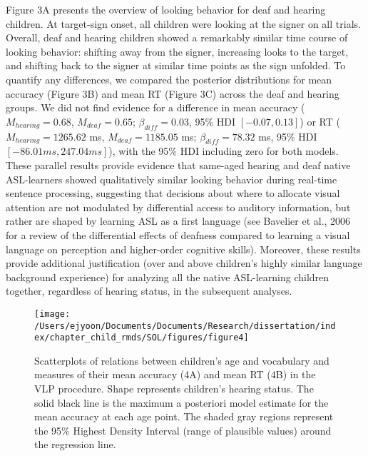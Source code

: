 \documentclass[oneside]{report}
\begin{document}
Figure 3A presents the overview of looking behavior for deaf and hearing
children. At target-sign onset, all children were looking at the signer
on all trials. Overall, deaf and hearing children showed a remarkably
similar time course of looking behavior: shifting away from the signer,
increasing looks to the target, and shifting back to the signer at
similar time points as the sign unfolded. To quantify any differences,
we compared the posterior distributions for mean accuracy (Figure 3B)
and mean RT (Figure 3C) across the deaf and hearing groups. We did not
find evidence for a difference in mean accuracy (\(M_{hearing} = 0.68\),
\(M_{deaf} = 0.65\); \(\beta_{diff} = 0.03\), 95\% HDI
\([-0.07, 0.13]\)) or RT (\(M_{hearing} = 1265.62\) ms,
\(M_{deaf} = 1185.05\) ms; \(\beta_{diff} = 78.32\) ms, 95\% HDI
\([-86.01 ms, 247.04 ms]\)), with the 95\% HDI including zero for both
models. These parallel results provide evidence that same-aged hearing
and deaf native ASL-learners showed qualitatively similar looking
behavior during real-time sentence processing, suggesting that decisions
about where to allocate visual attention are not modulated by
differential access to auditory information, but rather are shaped by
learning ASL as a first language (see Bavelier et al., 2006 for a review
of the differential effects of deafness compared to learning a visual
language on perception and higher-order cognitive skills). Moreover,
these results provide additional justification (over and above
children's highly similar language background experience) for analyzing
all the native ASL-learning children together, regardless of hearing
status, in the subsequent analyses.
\begin{figure}[!t]

{\centering \texttt{[image: /Users/ejyoon/Documents/Documents/Research/dissertation/index/chapter\_child\_rmds/SOL/figures/figure4]} 

}

\caption[Scatterplots of relations between children's age and vocabulary and ASL processing]{Scatterplots of relations between children's age and vocabulary and measures of their mean accuracy (4A) and mean RT (4B) in the VLP procedure. Shape represents children's hearing status. The solid black line is the maximum a posteriori model estimate for the mean accuracy at each age point. The shaded gray regions represent the 95\% Highest Density Interval (range of plausible values) around the regression line.}\label{fig:sol-corr-figure}
\end{figure}
\end{document}
